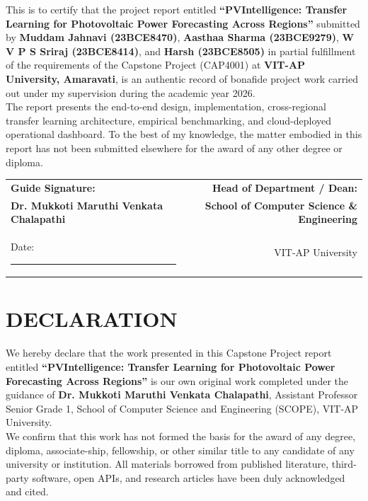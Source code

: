\documentclass[12pt,a4paper,oneside]{report}
\begin{document}
\noindent This is to certify that the project report entitled \textbf{``PVIntelligence: Transfer Learning for Photovoltaic Power Forecasting Across Regions''} submitted by \textbf{Muddam Jahnavi (23BCE8470)}, \textbf{Aasthaa Sharma (23BCE9279)}, \textbf{W V P S Sriraj (23BCE8414)}, and \textbf{Harsh (23BCE8505)} in partial fulfillment of the requirements of the Capstone Project (CAP4001) at \textbf{VIT-AP University, Amaravati}, is an authentic record of bonafide project work carried out under my supervision during the academic year 2026.\\[0.8cm]

\noindent The report presents the end-to-end design, implementation, cross-regional transfer learning architecture, empirical benchmarking, and cloud-deployed operational dashboard. To the best of my knowledge, the matter embodied in this report has not been submitted elsewhere for the award of any other degree or diploma.\\[2.5cm]

\noindent
\begin{tabular*}{\textwidth}{@{\extracolsep{\fill}}lr}
\textbf{Guide Signature:} \hrulefill & \textbf{Head of Department / Dean:} \hrulefill \\
\textbf{Dr. Mukkoti Maruthi Venkata Chalapathi} & \textbf{School of Computer Science \& Engineering} \\
Date: \rule{4cm}{0.4pt} & VIT-AP University \\
\end{tabular*}

\newpage
\chapter*{DECLARATION}
\thispagestyle{empty}

\noindent We hereby declare that the work presented in this Capstone Project report entitled \textbf{``PVIntelligence: Transfer Learning for Photovoltaic Power Forecasting Across Regions''} is our own original work completed under the guidance of \textbf{Dr. Mukkoti Maruthi Venkata Chalapathi}, Assistant Professor Senior Grade 1, School of Computer Science and Engineering (SCOPE), VIT-AP University.\\[0.5cm]

\noindent We confirm that this work has not formed the basis for the award of any degree, diploma, associate-ship, fellowship, or other similar title to any candidate of any university or institution. All materials borrowed from published literature, third-party software, open APIs, and research articles have been duly acknowledged and cited.\\[2cm]
\end{document}
